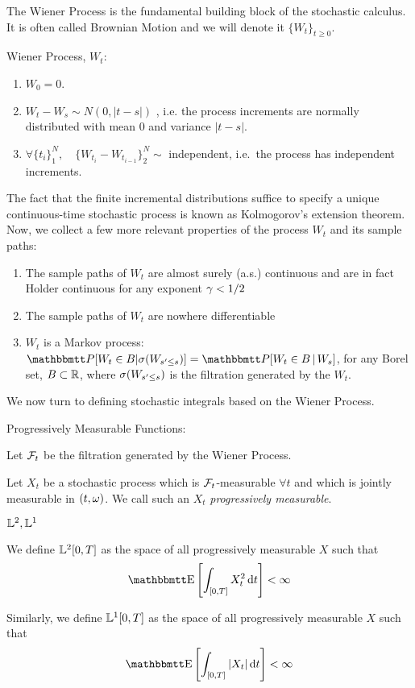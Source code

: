 The Wiener Process is the fundamental building block of the stochastic calculus. 
It is often called Brownian Motion and we will denote it $\{W_t\}_{t\geq 0}$. 
\begin{defn}Wiener Process, $W_t$:
\begin{enumerate}
  \item $W_0 = 0$.
  \item $W_t - W_s \sim N(0, |t-s|)$ , i.e. the process increments are
  normally distributed with mean 0 and variance $|t-s|$.
  \item $\forall \{t_i\}_1^N, \quad \{W_{t_i} - W_{t_{i-1}} \}_2^N \sim$
  independent, i.e.\ the process has independent increments.
\end{enumerate}
\end{defn}
The fact that the finite incremental distributions suffice to specify a unique
continuous-time stochastic process is known as Kolmogorov's extension theorem.
Now, we collect a few more relevant properties of the process $W_t$ and its
sample paths:
\begin{enumerate}
  \item The sample paths of $W_t$
are almost surely (a.s.) continuous and are in fact Holder continuous for any
exponent ${\gamma } < 1/2$
\item The sample paths of $W_t$ are nowhere differentiable
\item $W_t$ is a Markov process: $\Prob[W_t \in B | \s(W_{s' \leq s })] =
\Prob[W_t \in B \,| \,W_s]$, for any Borel set, $B \subset { \mathbb{R} }$, where $\sigma(W_{s'
\leq s })$ is the filtration generated by the $W_t$.
\end{enumerate}

We now turn to defining stochastic integrals based on the Wiener Process.
 
\begin{defn} Progressively Measurable Functions:

Let ${\mathcal{F}}_t$ be the filtration generated by the Wiener Process.

Let $X_t$ be a stochastic process which is ${\mathcal{F}}_t$-measurable $\forall t$ and
which is jointly measurable in $(t,{\omega})$. We call such an $X_t$
\emph{progressively measurable}.
\end{defn}

\begin{defn} ${\mathbb{L}^2}, {\mathbb{L}^1}$

We define ${\mathbb{L}^2}[0,T]$ as the space of all progressively measurable
$X$ such that
\begin{equation*}
\Exp \left[ \int_{[0,T]} X_t^2 \intd{t} \right] < \infty
\end{equation*}

Similarly, we define ${\mathbb{L}^1}[0,T]$ as the space of all progressively measurable
$X$ such that
\begin{equation*}
\Exp \left[ \int_{[0,T]} |X_t| \intd{t} \right] < \infty
\end{equation*} 
\end{defn}

